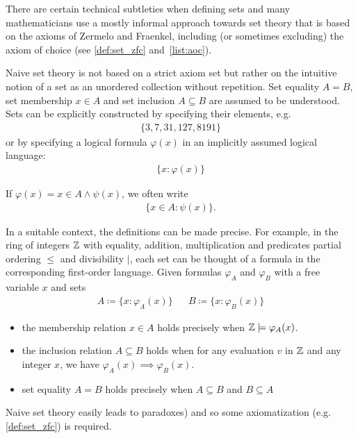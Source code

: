 There are certain technical subtleties when defining sets and many mathematicians use a mostly informal approach towards set theory that is based on the axioms of Zermelo and Fraenkel, including (or sometimes excluding) the axiom of choice (see \ref{def:set_zfc} and~\cref{list:aoc}).

\begin{definition}\label{def:set_naive}\cite[3]{Lectures:general_topology}
  Naive set theory is not based on a strict axiom set but rather on the intuitive notion of a set as an unordered collection without repetition. Set equality $A = B$, set membership $x \in A$ and set inclusion $A \subseteq B$ are assumed to be understood. Sets can be explicitly constructed by specifying their elements, e.g.
  \begin{align*}
    \{ 3, 7, 31, 127, 8191 \}
  \end{align*}
  or by specifying a logical formula $\varphi(x)$ in an implicitly assumed logical language:
  \begin{align*}
    \{ x \colon \varphi(x) \}
  \end{align*}

  If $\varphi(x) = x \in A \land \psi(x)$, we often write
  \begin{align*}
    \{ x \in A \colon \psi(x) \}.
  \end{align*}

  In a suitable context, the definitions can be made precise. For example, in the ring of integers $\mathbb Z$ with equality, addition, multiplication and predicates partial ordering $\leq$ and divisibility $\vert$, each set can be thought of a formula in the corresponding first-order language. Given formulas $\varphi_A$ and $\varphi_B$ with a free variable $x$ and sets
  \begin{align*}
    A \coloneqq \{ x \colon \varphi_A(x) \} && B \coloneqq \{ x \colon \varphi_B(x) \}
  \end{align*}

  \begin{itemize}
    \item the membership relation $x \in A$ holds precisely when $\mathbb Z \models \varphi_A(x)$.

    \item the inclusion relation $A \subseteq B$ holds when for any evaluation $v$ in $\mathbb Z$ and any integer $x$, we have $\varphi_A(x) \implies \varphi_B(x)$.

    \item set equality $A = B$ holds precisely when $A \subseteq B$ and $B \subseteq A$
  \end{itemize}

  Naive set theory easily leads to paradoxes) and so some axiomatization (e.g. \cref{def:set_zfc}) is required.
\end{definition}

